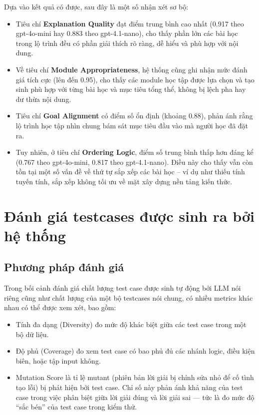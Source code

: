 Dựa vào kết quả có được, sau đây là một số nhận xét sơ bộ:
\begin{itemize}
    \item Tiêu chí \textbf{Explanation Quality} đạt điểm trung bình cao nhất (0.917 theo gpt-4o-mini hay 0.883 theo gpt-4.1-nano), cho thấy phần lớn các bài học trong lộ trình đều có phần giải thích rõ ràng, dễ hiểu và phù hợp với nội dung.

    \item Về tiêu chí \textbf{Module Appropriateness}, hệ thống cũng ghi nhận mức đánh giá tích cực (lên đến 0.95), cho thấy các module học tập được lựa chọn và tạo sinh phù hợp với từng bài học và mục tiêu tổng thể, không bị lệch pha hay dư thừa nội dung.

    \item Tiêu chí \textbf{Goal Alignment} có điểm số ổn định (khoảng 0.88), phản ánh rằng lộ trình học tập nhìn chung bám sát mục tiêu đầu vào mà người học đã đặt ra.

    \item Tuy nhiên, ở tiêu chí \textbf{Ordering Logic}, điểm số trung bình thấp hơn đáng kể (0.767 theo gpt-4o-mini, 0.817 theo gpt-4.1-nano). Điều này cho thấy vẫn còn tồn tại một số vấn đề về thứ tự sắp xếp các bài học – ví dụ như thiếu tính tuyến tính, sắp xếp không tối ưu về mặt xây dựng nền tảng kiến thức.
\end{itemize}

\section{Đánh giá testcases được sinh ra bởi hệ thống}
\subsection{Phương pháp đánh giá}
Trong bối cảnh đánh giá chất lượng test case được sinh tự động bởi LLM nói riêng cũng như chất lượng của một bộ testcases nói chung, có nhiều metrics khác nhau có thể được xem xét, bao gồm:
\begin{itemize}
    \item Tính đa dạng (Diversity) đo mức độ khác biệt giữa các test case trong một bộ dữ liệu.
    \item Độ phủ (Coverage) đo xem test case có bao phủ đủ các nhánh logic, điều kiện biên, hoặc tập input không.
    \item Mutation Score là tỉ lệ mutant (phiên bản lời giải bị chỉnh sửa nhỏ để cố tình tạo lỗi) bị phát hiện bởi test case. Chỉ số này phản ánh khả năng của test case trong việc phân biệt giữa lời giải đúng và lời giải sai — tức là đo mức độ “sắc bén” của test case trong kiểm thử.

\end{itemize}

